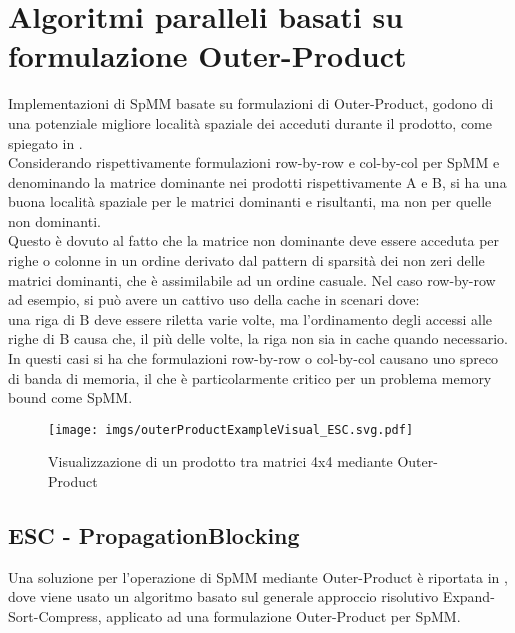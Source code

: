 \section{Algoritmi paralleli basati su formulazione Outer-Product}
Implementazioni di SpMM basate su formulazioni di Outer-Product, godono di una
potenziale migliore località spaziale dei \nnz acceduti durante il prodotto,
come spiegato in \cite{ESC}.\\
\label{ChExistingTecqs:gustavsonDerivateBadAccessLocalityNNDominantMatrix}
Considerando rispettivamente formulazioni row-by-row e col-by-col per SpMM e denominando 
la matrice dominante nei prodotti rispettivamente A e B,
si ha una buona località spaziale per le matrici dominanti e risultanti, ma non per quelle non dominanti.\\
Questo è dovuto al fatto che la matrice non dominante deve essere acceduta per righe o colonne 
in un ordine derivato dal pattern di sparsità dei non zeri delle matrici dominanti, che è assimilabile ad un ordine casuale.
\voidLine
Nel caso row-by-row ad esempio, si può avere un cattivo uso della cache in scenari dove:\\
una riga di B deve essere riletta varie volte, ma l'ordinamento degli accessi alle righe di B causa
che, il più delle volte, la riga non sia in cache quando necessario.\\
In questi casi si ha che formulazioni row-by-row o col-by-col causano uno spreco di banda di memoria,
il che è particolarmente critico per un problema memory bound come SpMM.\\
\begin{figure}[H]
  \centering \texttt{[image: imgs/outerProductExampleVisual\_ESC.svg.pdf]}
  \caption[esempio di prodotto con Outer-Product]{Visualizzazione di un prodotto tra matrici 4x4 mediante Outer-Product}
  \decoRule \label{fig:outerProductExampleVisual_ESC}
\end{figure}

\subsection{ESC - PropagationBlocking}
Una soluzione per l'operazione di SpMM mediante Outer-Product è riportata in \cite{ESC},
dove viene usato un algoritmo basato sul generale approccio risolutivo Expand-Sort-Compress, %
applicato ad una formulazione Outer-Product per SpMM.\\

